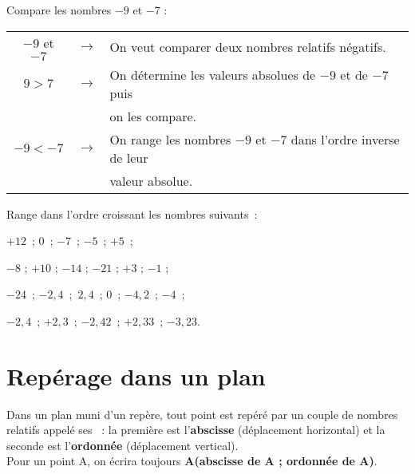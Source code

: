 \vspace{4em}


\begin{methode*1}

\begin{exemple*1}
Compare les nombres $-9$ et $-7$ : \\[0.5em]
\begin{tabular}{ccl} 
 $-9$ et $-7$ & $\longrightarrow$ & On veut comparer deux nombres relatifs négatifs. \\
 $9 > 7$ & $\longrightarrow$ & On détermine les valeurs absolues de $-9$ et de $-7$ puis  \\
& & on les compare. \\
 $-9 < -7$ & $\longrightarrow$ & On range les nombres $-9$ et $-7$ dans l'ordre inverse de leur  \\
 & & valeur absolue. \\
 \end{tabular}
\end{exemple*1}


\exercice
Range dans l'ordre croissant les nombres suivants : 
\begin{colenumerate}{2}
 \item $+12$ ; 0 ; $-7$ ; $-5$ ; $+5$ ;
 \item $-8$ ; $+10$ ; $-14$ ; $-21$ ; $+3$ ; $-1$ ;
 \item $-24$ ; $-2,4$ ; $2,4$ ; 0 ; $-4,2$ ; $-4$ ;
 \item $-2,4$ ; $+2,3$ ; $-2,42$ ; $+2,33$ ; $-3,23$.
 \end{colenumerate}

\end{methode*1}
\newpage


\section{Repérage dans un plan}

\vspace{3em}

\begin{definition}
Dans un plan muni d'un repère, tout point est repéré par un couple de nombres relatifs appelé ses  : la première est l'\textcolor{C2}{\textbf{abscisse}} (déplacement horizontal) et la seconde est l'\textcolor{C2}{\textbf{ordonnée}} (déplacement vertical).\\
Pour un point A, on écrira toujours \textbf{A(abscisse de A ; ordonnée de A)}.
\end{definition}

